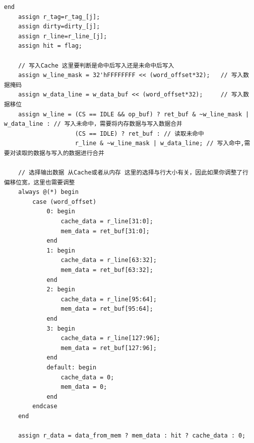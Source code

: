 \documentclass[12pt,a4paper]{ctexart}
\begin{document}
\begin{lstlisting}[style=verilog]
    end
    assign r_tag=r_tag_[j];
    assign dirty=dirty_[j];
    assign r_line=r_line_[j];
    assign hit = flag;

    // 写入Cache 这里要判断是命中后写入还是未命中后写入
    assign w_line_mask = 32'hFFFFFFFF << (word_offset*32);   // 写入数据掩码
    assign w_data_line = w_data_buf << (word_offset*32);     // 写入数据移位
    assign w_line = (CS == IDLE && op_buf) ? ret_buf & ~w_line_mask | w_data_line : // 写入未命中，需要将内存数据与写入数据合并
                    (CS == IDLE) ? ret_buf : // 读取未命中
                    r_line & ~w_line_mask | w_data_line; // 写入命中,需要对读取的数据与写入的数据进行合并

    // 选择输出数据 从Cache或者从内存 这里的选择与行大小有关，因此如果你调整了行偏移位宽，这里也需要调整
    always @(*) begin
        case (word_offset)
            0: begin
                cache_data = r_line[31:0];
                mem_data = ret_buf[31:0];
            end
            1: begin
                cache_data = r_line[63:32];
                mem_data = ret_buf[63:32];
            end
            2: begin
                cache_data = r_line[95:64];
                mem_data = ret_buf[95:64];
            end
            3: begin
                cache_data = r_line[127:96];
                mem_data = ret_buf[127:96];
            end
            default: begin
                cache_data = 0;
                mem_data = 0;
            end
        endcase
    end

    assign r_data = data_from_mem ? mem_data : hit ? cache_data : 0;


\end{lstlisting}
\end{document}
